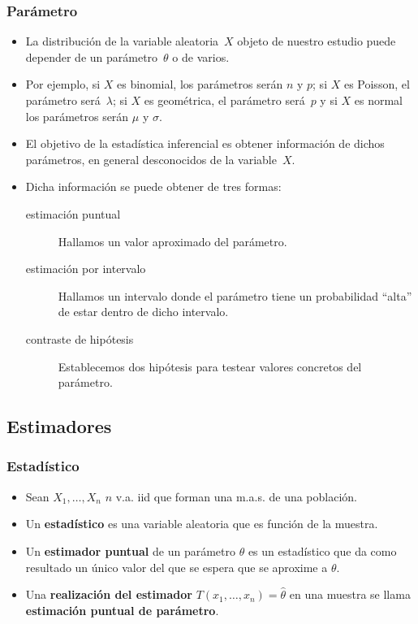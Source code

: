 \begin{frame}
\frametitle{Parámetro}
\begin{itemize}
\item  La distribución de la variable aleatoria~$X$ objeto de nuestro estudio puede depender de un parámetro~$\theta$ o de varios.

\item Por ejemplo, si $X$ es binomial, los parámetros serán $n$ y $p$; si $X$ es Poisson, el parámetro será~$\lambda$; si $X$ es geométrica, el
parámetro será~$p$ y si $X$ es normal los parámetros serán $\mu$ y $\sigma$.

\item El objetivo de la estadística inferencial es obtener información de dichos parámetros, en general desconocidos de la variable~$X$.

\item Dicha información se puede obtener de tres formas: 
\begin{description}
 \item[estimación puntual] Hallamos un valor aproximado del parámetro.
\item[estimación por intervalo] Hallamos un intervalo donde el parámetro tiene un probabilidad ``alta'' de estar dentro de dicho intervalo.
\item[contraste de hipótesis] Establecemos dos hipótesis para testear valores concretos del parámetro.
\end{description}
\end{itemize}
\end{frame}

\begin{frame}

\section{Estimadores}
\frametitle{Estadístico}
\begin{itemize}
\item Sean $X_1,\ldots,X_n$ $n$ v.a. iid que forman una m.a.s.
  de una población. 
\item Un  \textbf{estadístico} es una variable aleatoria que es función de la muestra.
\item  Un \textbf{estimador puntual} de un parámetro $\theta$ es un estadístico que da
 como resultado un único valor del que se espera que se aproxime a $\theta$.
\item  Una \textbf{realización del estimador} $T(x_{1},\ldots,x_{n})=\hat{\theta }$
 en una muestra se llama \textbf{ estimación puntual de parámetro}.
\end{itemize}
\end{frame}

